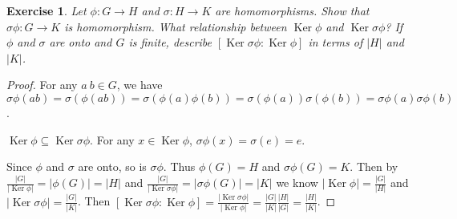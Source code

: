 \documentclass[14pt]{extarticle}
\newtheorem{exercise}{Exercise}[section]
\newcommand{\1}{\{ e \}}
\DeclareMathOperator{\Ker}{Ker}
\begin{document}
\setcounter{exercise}{6}
\begin{exercise}
  Let $\phi : G \rightarrow H$ and $\sigma : H \rightarrow K$ are homomorphisms.
  Show that $\sigma \phi : G \rightarrow K$ is homomorphism.
  What relationship between $\Ker \phi$ and $\Ker \sigma \phi$?
  If $\phi$ and $\sigma$ are onto and $G$ is finite, 
  describe $[ \Ker \sigma \phi : \Ker \phi ]$ in terms of $|H|$ and $|K|$.
\end{exercise}
\begin{proof}
  For any $a \ b \in G$, we have $\sigma\phi(ab) = \sigma(\phi(ab)) = \sigma(\phi(a)\phi(b)) = \sigma(\phi(a)) \sigma(\phi(b)) = \sigma\phi(a) \sigma\phi(b)$.

  $\Ker \phi \subseteq \Ker \sigma \phi$. 
  For any $x \in \Ker \phi$, $\sigma\phi(x) = \sigma(e) = e$.

  Since $\phi$ and $\sigma$ are onto, so is $\sigma\phi$.
  Thus $\phi(G) = H$ and $\sigma\phi(G) = K$.
  Then 
  by $\displaystyle \frac{|G|}{|\Ker \phi|} = |\phi(G)| = |H|$ 
  and $\displaystyle \frac{|G|}{|\Ker \sigma \phi|} = |\sigma \phi(G)| = |K|$
  we know $\displaystyle |\Ker \phi| = \frac{|G|}{|H|}$
  and $\displaystyle |\Ker \sigma \phi| = \frac{|G|}{|K|}$.
  Then 
  $\displaystyle [ \Ker \sigma \phi : \Ker \phi ] = \frac{|\Ker \sigma \phi|}{|\Ker \phi|} = \frac{|G|}{|K|} \frac{|H|}{|G|} = \frac{|H|}{|K|}$.
\end{proof}
\end{document}
